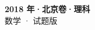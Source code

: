 \documentclass[zihao=-4, a4paper]{ctexart}
\begin{document}
\begin{center}
  {\Large\bfseries 2018 年·北京卷·理科}\\[4pt]
  {\large 数学 · 试题版}
\end{center}
\medskip
{}

\end{document}
